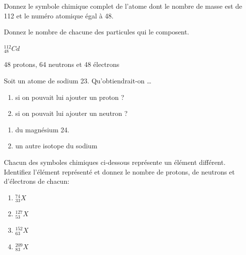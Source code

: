 \documentclass[
  11pt,
  a4paper,
  openany]{book}
\providecommand{\tightlist}{%
  \setlength{\itemsep}{0pt}\setlength{\parskip}{0pt}}
\begin{document}
\begin{Exercise}

Donnez le symbole chimique complet de l'atome dont le nombre de masse est de 112 et le numéro atomique égal à 48.


Donnez le nombre de chacune des particules qui le composent.


\end{Exercise}

\begin{Answer}
\(_{48}^{112}Cd\)

48 protons, 64 neutrons et 48 électrons

\end{Answer}

\begin{Exercise}

Soit un atome de sodium 23. Qu'obtiendrait-on \ldots{}

\begin{enumerate}
\def\labelenumi{\arabic{enumi}.}
\tightlist
\item
  si on pouvait lui ajouter un proton ?\\
\item
  si on pouvait lui ajouter un neutron ?\\
\end{enumerate}

\end{Exercise}

\begin{Answer}

\begin{enumerate}
\def\labelenumi{\arabic{enumi}.}
\tightlist
\item
  du magnésium 24.
\item
  un autre isotope du sodium
\end{enumerate}

\end{Answer}

\newpage

\begin{Exercise}

Chacun des symboles chimiques ci-dessous représente un élément différent. Identifiez l'élément représenté et donnez le nombre de protons, de neutrons et d'électrons de chacun:

\begin{enumerate}
\def\labelenumi{\arabic{enumi}.}
\tightlist
\item
  \(^{74}_{33}X\)\\
\item
  \(^{127}_{53}X\)\\
\item
  \(^{152}_{63}X\)\\
\item
  \(^{209}_{83}X\)
\end{enumerate}

\end{Exercise}
\end{document}
